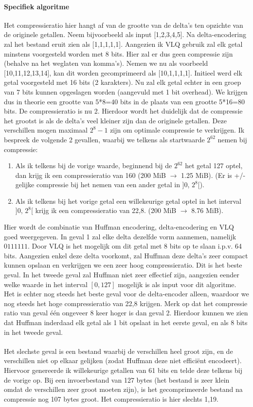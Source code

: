 \documentclass[11pt, a4paper]{article}
\begin{document}
\paragraph{Specifiek algoritme}
Het compressieratio hier hangt af van de grootte van de delta's ten opzichte van de originele getallen. Neem bijvoorbeeld als input [1,2,3,4,5]. 
Na delta-encodering zal het bestand eruit zien als [1,1,1,1,1]. 
Aangezien ik VLQ gebruik zal elk getal minstens voorgesteld worden met 8 bits. Hier zal er dus geen compressie zijn (behalve na het weglaten van komma's).
Nemen we nu als voorbeeld [10,11,12,13,14], kan dit worden gecomprimeerd als [10,1,1,1,1]. Initieel werd elk getal voorgesteld met 16 bits (2 karakters). Nu zal elk getal echter in een groep van 7 bits kunnen opgeslagen worden (aangevuld met 1 bit overhead). We krijgen dus in theorie een grootte van 5*8=40 bits in de plaats van een grootte 5*16=80 bits. De compressieratio is nu 2. Hierdoor wordt het duidelijk dat de compressie het grootst is als de delta's veel kleiner zijn dan de originele getallen. Deze verschillen mogen maximaal $2^8-1$ zijn om optimale compressie te verkrijgen.
Ik bespreek de volgende 2 gevallen, waarbij we telkens als startwaarde $2^{62}$ nemen bij compressie: 
\begin{enumerate}
	\item Als ik telkens bij de vorige waarde, beginnend bij de $2^{62}$ het getal 127 optel, dan krijg ik een compressieratio van 160 (200 MiB $\rightarrow$ 1.25 MiB). (Er is +/- gelijke compressie bij het nemen van een ander getal in ]0, $2^8$[). 
	\item Als ik telkens bij het vorige getal een willekeurige getal optel in het interval ]0, $2^8$[ krijg ik een compressieratio van 22,8. (200 MiB $\rightarrow$ 8.76 MiB).
\end{enumerate}
Hier wordt de combinatie van Huffman encodering, delta-encodering en VLQ goed weergegeven. In geval 1 zal elke delta dezelfde vorm aannemen, namelijk $0111111$. Door VLQ is het mogelijk om dit getal met 8 bits op te slaan i.p.v. 64 bits. Aangezien enkel deze delta voorkomt, zal Huffman deze delta's zeer compact kunnen opslaan en verkrijgen we een zeer hoog compressieratio. Dit is het beste geval. In het tweede geval zal Huffman niet zeer effectief zijn, aangezien eender welke waarde in het interval $[0, 127]$ mogelijk is als input voor dit algoritme. Het is echter nog steeds het beste geval voor de delta-encoder alleen, waardoor we nog steeds het hoge compressieratio van 22,8 krijgen. Merk  op dat het compressie ratio van geval \'{e}\'{e}n ongeveer 8 keer hoger is dan geval 2. Hierdoor kunnen we zien dat Huffman inderdaad elk getal als 1 bit opslaat in het eerste geval, en als 8 bits in het tweede geval. 
\\\\Het slechste geval is een bestand waarbij de verschillen heel groot zijn, en de verschillen niet op elkaar gelijken (zodat Huffman deze niet effici\"{e}nt encodeert). Hiervoor genereerde ik willekeurige getallen van 61 bits en telde deze telkens bij de vorige op. Bij een invoerbestand van 127 bytes (het bestand is zeer klein omdat de verschillen zeer groot moeten zijn), is het gecomprimeerde bestand na compressie nog 107 bytes groot. Het compressieratio is hier slechts 1,19.  
\end{document}
